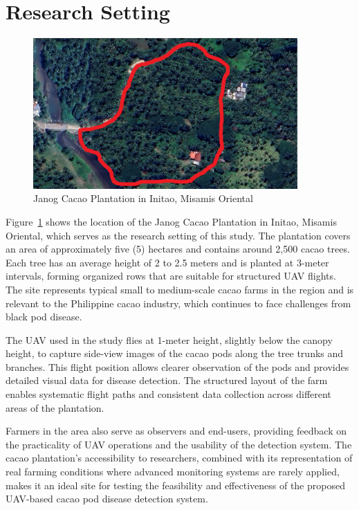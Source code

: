 \section{Research Setting}

\begin{figure}[H]
	\centering
	\caption{Janog Cacao Plantation in Initao, Misamis Oriental}
	\label{fig:cacao_farm}
	\includegraphics[width=0.9\textwidth]{figures/Cacao_Farm.pdf}
\end{figure}

Figure~\ref{fig:cacao_farm} shows the location of the Janog Cacao Plantation in Initao, Misamis Oriental, which serves as the research setting of this study. The plantation covers an area of approximately five (5) hectares and contains around 2,500 cacao trees. Each tree has an average height of 2 to 2.5 meters and is planted at 3-meter intervals, forming organized rows that are suitable for structured UAV flights. The site represents typical small to medium-scale cacao farms in the region and is relevant to the Philippine cacao industry, which continues to face challenges from black pod disease.

The UAV used in the study flies at 1-meter height, slightly below the canopy height, to capture side-view images of the cacao pods along the tree trunks and branches. This flight position allows clearer observation of the pods and provides detailed visual data for disease detection. The structured layout of the farm enables systematic flight paths and consistent data collection across different areas of the plantation.

Farmers in the area also serve as observers and end-users, providing feedback on the practicality of UAV operations and the usability of the detection system. The cacao plantation’s accessibility to researchers, combined with its representation of real farming conditions where advanced monitoring systems are rarely applied, makes it an ideal site for testing the feasibility and effectiveness of the proposed UAV-based cacao pod disease detection system.


